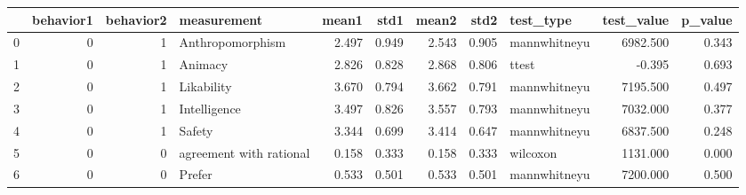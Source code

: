 \begin{tabular}{lrrlrrrrlrr}
\toprule
{} &  behavior1 &  behavior2 &              measurement &  mean1 &   std1 &  mean2 &   std2 &     test\_type &  test\_value &  p\_value \\
\midrule
0 &          0 &          1 &         Anthropomorphism &  2.497 &  0.949 &  2.543 &  0.905 &  mannwhitneyu &    6982.500 &    0.343 \\
1 &          0 &          1 &                  Animacy &  2.826 &  0.828 &  2.868 &  0.806 &         ttest &      -0.395 &    0.693 \\
2 &          0 &          1 &               Likability &  3.670 &  0.794 &  3.662 &  0.791 &  mannwhitneyu &    7195.500 &    0.497 \\
3 &          0 &          1 &             Intelligence &  3.497 &  0.826 &  3.557 &  0.793 &  mannwhitneyu &    7032.000 &    0.377 \\
4 &          0 &          1 &                   Safety &  3.344 &  0.699 &  3.414 &  0.647 &  mannwhitneyu &    6837.500 &    0.248 \\
5 &          0 &          0 &  agreement with rational &  0.158 &  0.333 &  0.158 &  0.333 &      wilcoxon &    1131.000 &    0.000 \\
6 &          0 &          0 &                   Prefer &  0.533 &  0.501 &  0.533 &  0.501 &  mannwhitneyu &    7200.000 &    0.500 \\
\bottomrule
\end{tabular}
